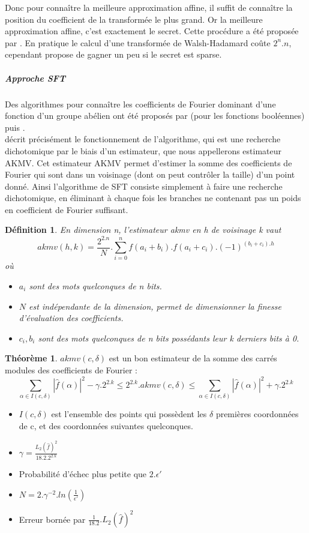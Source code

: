 \documentclass{article}		%
\newtheorem{defi}{Définition}
\theoremstyle{definition}
\newtheorem{theo}{Théorème}
\theoremstyle{plain}
\theoremstyle{plain}
\theoremstyle{plain}
\theoremstyle{plain}
\begin{document}
Donc pour connaître la meilleure approximation affine, il suffit de connaître la position du coefficient de la transformée
le plus grand. Or la meilleure approximation affine, c'est exactement le
secret.
 Cette procédure a été proposée par \cite{LF}.
En pratique le calcul d'une transformée de Walsh-Hadamard coûte $2^n.n$,
cependant \cite{Kirchner} propose de gagner un peu si le secret est
sparse. 
 
\subparagraph{Approche SFT}
\label{SFT}
Des algorithmes pour connaître les coefficients de Fourier dominant d'une fonction d'un groupe
abélien ont été proposés par \cite{Mansour} (pour les fonctions booléennes)
puis  \cite{Akavia}.
\\
\cite{Vaudenay} décrit précisément le fonctionnement de
l'algorithme, qui est une recherche dichotomique par le biais d'un
estimateur, que nous appellerons estimateur AKMV. Cet estimateur AKMV
permet d'estimer la somme des coefficients de Fourier qui sont dans un
voisinage (dont on peut contrôler la taille) d'un point donné. Ainsi
l'algorithme de SFT consiste simplement à faire une recherche
dichotomique, en éliminant à chaque fois les branches ne contenant pas un
poids en coefficient de Fourier suffisant.
\begin{defi}
 En dimension n, l'estimateur akmv en h de voisinage k vaut
$$akmv(h, k)=\frac{2^{2.n}}{N}.\sum_{i=0}^{n}
f(a_i+b_i).f(a_i+c_i).(-1)^{(b_i+c_i).h}$$
où 
\begin{itemize}
\item $a_i$ sont des mots quelconques de n bits.
\item $N$ est indépendante de la dimension, permet de dimensionner la
finesse d'évaluation des coefficients.
\item $c_i, b_i$ sont des mots quelconques de n bits possédants leur k derniers bits à
0.
\end{itemize}
\end{defi}

\begin{theo}\cite{Vaudenay}
$akmv(c, \delta)$ est un bon estimateur de la somme des carrés modules des coefficients
de Fourier :
$$\sum_{\alpha\in I(c, \delta)} |\hat{f}(\alpha)|^2 - \gamma.2^{2.k}\leq
2^{2.k}.akmv(c, \delta)\leq
\sum_{\alpha\in I(c, \delta)} |\hat{f}(\alpha)|^2 +  \gamma.2^{2.k}$$
\begin{itemize}
\item $I(c, \delta)$ est l'ensemble des points qui possèdent les $\delta$
premières coordonnées de c, et des coordonnées suivantes quelconques.
\item $\gamma=\frac{L_2(\hat{f})^2}{18.2.2^{2.k}}$
\item Probabilité d'échec plus petite que $2.\epsilon'$ 
\item $N=2.\gamma^{-2}.ln(\frac{1}{\epsilon'})$
\item Erreur bornée par $\frac{1}{18.2}.L_2(\hat{f})^2$ 
\end{itemize} 
\end{theo}
\end{document}
